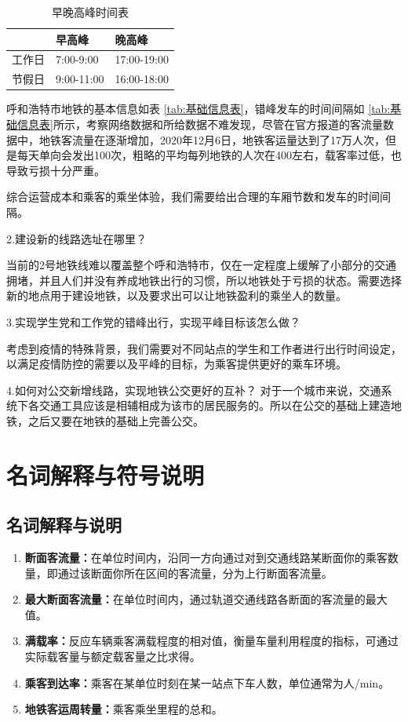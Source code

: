 \documentclass[12pt,a4paper]{mcmthesis}
\newcommand\wordc[1]{\textbf{#1}}
\begin{document}
   \begin{table}
  	\centering
  	\begin{tabular}{|l|l|l|}
  		\hline
  		& 早高峰 & 晚高峰 \\ \hline
  		工作日 & 7:00-9:00 & 17:00-19:00 \\ \hline
  		节假日 & 9:00-11:00 & 16:00-18:00 \\ \hline
  	\end{tabular}
  	\caption{早晚高峰时间表}
  	\label{tab:早晚高峰}
  \end{table}


 呼和浩特市地铁的基本信息如表 \ref{tab:基础信息表}，错峰发车的时间间隔如 \ref{tab:基础信息表}所示，考察网络数据和所给数据不难发现，尽管在官方报道的客流量数据中，地铁客流量在逐渐增加，2020年12月6日，地铁客运量达到了17万人次，但是每天单向会发出100次，粗略的平均每列地铁的人次在400左右，载客率过低，也导致亏损十分严重。

综合运营成本和乘客的乘坐体验，我们需要给出合理的车厢节数和发车的时间间隔。

{2.建设新的线路选址在哪里？}

当前的2号地铁线难以覆盖整个呼和浩特市，仅在一定程度上缓解了小部分的交通拥堵，并且人们并没有养成地铁出行的习惯，所以地铁处于亏损的状态。需要选择新的地点用于建设地铁，以及要求出可以让地铁盈利的乘坐人的数量。

  {3.实现学生党和工作党的错峰出行，实现平峰目标该怎么做？}

考虑到疫情的特殊背景，我们需要对不同站点的学生和工作者进行出行时间设定，以满足疫情防控的需要以及平峰的目标，为乘客提供更好的乘车环境。

  {4.如何对公交新增线路，实现地铁公交更好的互补？}
  对于一个城市来说，交通系统下各交通工具应该是相辅相成为该市的居民服务的。所以在公交的基础上建造地铁，之后又要在地铁的基础上完善公交。




\section{名词解释与符号说明}

\subsection{名词解释与说明}
\begin{enumerate}
	\item \wordc{断面客流量：}在单位时间内，沿同一方向通过对到交通线路某断面你的乘客数量，即通过该断面你所在区间的客流量，分为上行断面客流量。

	\item \wordc{最大断面客流量：}在单位时间内，通过轨道交通线路各断面的客流量的最大值。

	\item \wordc{满载率：}反应车辆乘客满载程度的相对值，衡量车量利用程度的指标，可通过实际载客量与额定载客量之比求得。

	\item \wordc{乘客到达率：}乘客在某单位时刻在某一站点下车人数，单位通常为人/min。
	\item \wordc{地铁客运周转量：}乘客乘坐里程的总和。




\end{enumerate}
\end{document}
